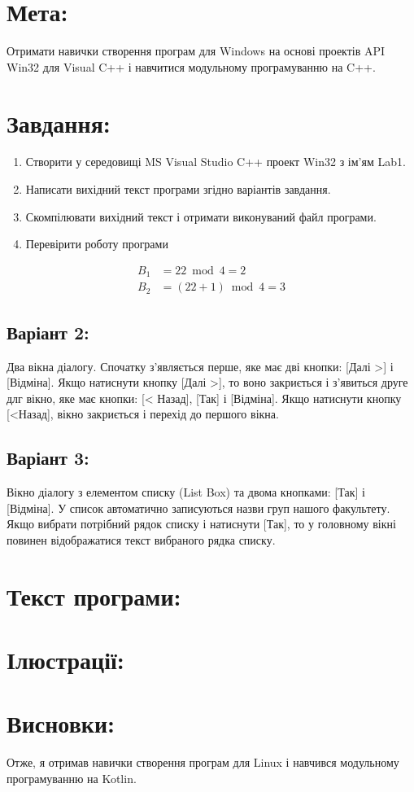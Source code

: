 \documentclass[14pt]{article}
\begin{document}

\tableofcontents
\newpage

\section{Мета:}
Отримати навички створення програм для Windows на основі проектів API
Win32 для Visual C++ і навчитися модульному програмуванню на C++.
\section{Завдання:}
\begin{enumerate}
    \item Створити у середовищі MS Visual Studio C++ проект Win32 з ім’ям Lab1.
    \item Написати вихідний текст програми згідно варіантів завдання.
    \item Скомпілювати вихідний текст і отримати виконуваний файл програми.
    \item Перевірити роботу програми
\end{enumerate}

\begin{align}
    B_1 &= 22 \bmod 4 = 2 \\
    B_2 &= (22+1) \bmod 4 = 3    
\end{align}

\subsection{Варіант 2:}
Два вікна діалогу. Спочатку
з’являється перше, яке має дві
кнопки: [Далі >] і [Відміна].
Якщо натиснути кнопку [Далі
>], то воно закриється і
з’явиться друге длг вікно, яке
має кнопки: [< Назад], [Так] і
[Відміна]. Якщо натиснути
кнопку [<Назад], вікно
закриється і перехід до
першого вікна.
\subsection{Варіант 3:}
Вікно діалогу з елементом
списку (List Box) та двома
кнопками: [Так] і [Відміна]. У
список автоматично
записуються назви груп
нашого факультету. Якщо
вибрати потрібний рядок
списку і натиснути [Так], то у
головному вікні повинен
відображатися текст
вибраного рядка списку.

\section{Текст програми:}


\section{Ілюстрації:}


\section{Висновки:}
Отже, я отримав навички створення програм для Linux і навчився модульному програмуванню на Kotlin.
\end{document}
